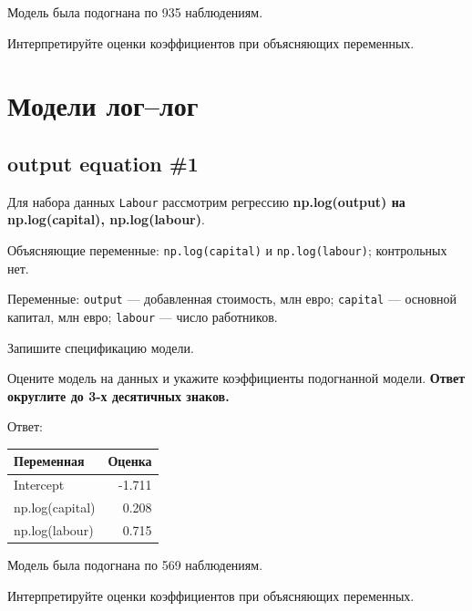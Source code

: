 \documentclass[
  russian,
]{article}
\newcounter{none} %
\begin{document}
Модель была подогнана по 935 наблюдениям.

Интерпретируйте оценки коэффициентов при объясняющих переменных.

\section{Модели
лог--лог}\label{ux43cux43eux434ux435ux43bux438-ux43bux43eux433ux43bux43eux433}

\subsection{output equation \#1}\label{output-equation-1}

Для набора данных \texttt{Labour} рассмотрим регрессию
\textbf{np.log(output) на np.log(capital), np.log(labour)}.

Объясняющие переменные: \texttt{np.log(capital)} и
\texttt{np.log(labour)}; контрольных нет.

Переменные: \texttt{output} --- добавленная стоимость, млн евро;
\texttt{capital} --- основной капитал, млн евро; \texttt{labour} ---
число работников.

Запишите спецификацию модели.

Оцените модель на данных и укажите коэффициенты подогнанной модели.
\textbf{Ответ округлите до 3-х десятичных знаков.}

Ответ:

{\def\LTcaptype{none} %
\begin{longtable}[]{@{}lr@{}}
\toprule\noalign{}
Переменная & Оценка \\
\midrule\noalign{}
\endhead
\bottomrule\noalign{}
\endlastfoot
Intercept & -1.711 \\
np.log(capital) & 0.208 \\
np.log(labour) & 0.715 \\
\end{longtable}
}

Модель была подогнана по 569 наблюдениям.

Интерпретируйте оценки коэффициентов при объясняющих переменных.
\end{document}
